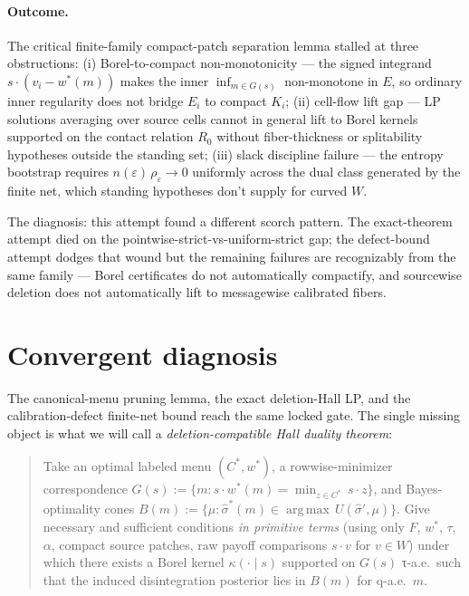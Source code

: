 \documentclass[11pt]{article}
\theoremstyle{definition}
\theoremstyle{remark}
\newcommand{\eps}{\varepsilon}
\newcommand{\argmax}{\operatorname*{arg\,max}}
\begin{document}
\paragraph{Outcome.} The critical finite-family compact-patch
separation lemma stalled at three obstructions: (i) Borel-to-compact
non-monotonicity --- the signed integrand $s\cdot(v_i - w^*(m))$
makes the inner $\inf_{m\in G(s)}$ non-monotone in $E$, so ordinary
inner regularity does not bridge $E_i$ to compact $K_i$; (ii)
cell-flow lift gap --- LP solutions averaging over source cells
cannot in general lift to Borel kernels supported on the contact
relation $R_0$ without fiber-thickness or splitability hypotheses
outside the standing set; (iii) slack discipline failure --- the
entropy bootstrap requires $n(\eps)\,\rho_\eps \to 0$ uniformly
across the dual class generated by the finite net, which standing
hypotheses don't supply for curved $W$.

The diagnosis: this attempt found a different scorch pattern.
The exact-theorem attempt died on the
pointwise-strict-vs-uniform-strict gap; the defect-bound attempt
dodges that wound but the remaining failures are recognizably from
the same family --- Borel certificates do not automatically
compactify, and sourcewise deletion does not automatically lift to
messagewise calibrated fibers.

\section{Convergent diagnosis}\label{sec:diagnosis}

The canonical-menu pruning lemma, the exact deletion-Hall LP, and
the calibration-defect finite-net bound reach the same locked gate.
The single missing object is what we will call a
\emph{deletion-compatible Hall duality theorem}:

\begin{quote}
Take an optimal labeled menu $(C^*, w^*)$, a rowwise-minimizer
correspondence $G(s) := \{m : s\cdot w^*(m) = \min_{z\in C^*}\,s\cdot z\}$,
and Bayes-optimality cones $B(m) := \{\mu : \hat\sigma^*(m)\in\argmax\,U(\hat\sigma',\mu)\}$.
Give necessary and sufficient conditions \emph{in primitive terms}
(using only $F$, $w^*$, $\tau$, $\alpha$, compact source patches,
raw payoff comparisons $s\cdot v$ for $v\in W$) under which there
exists a Borel kernel $\kappa(\cdot\mid s)$ supported on $G(s)$
τ-a.e.\ such that the induced disintegration posterior lies in $B(m)$
for q-a.e.~$m$.
\end{quote}
\end{document}
